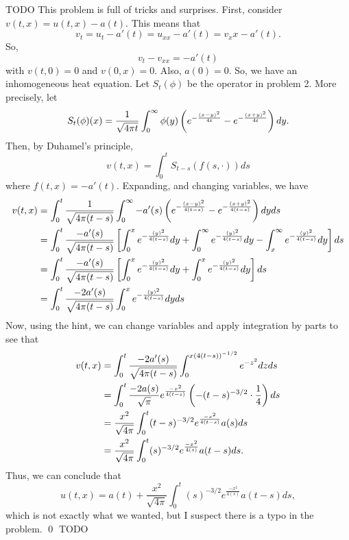 \documentclass{article}
\begin{document}
\newpage
{} TODO
 \tri
\hop 
\solution
This problem is full of tricks and surprises. First, consider $v(t,x) = u(t,x) - a(t)$. This means that 
\[v_t = u_t - a'(t) = u_{xx} - a'(t)= v_xx - a'(t).\]
So, 
\[v_t - v_{xx} = -a'(t)\]
with $v(t,0)= 0$ and $v(0,x) = 0$. Also, $a(0)= 0$. So, we have an inhomogeneous heat equation.
\hop 
Let $S_t(\phi)$ be the operator in problem 2. More precisely, let 
\[S_t(\phi)(x) = \frac{1}{\sqrt{4\pi t}} \int_0^\infty \phi(y)\del{e^{-\frac{(x-y)^2}{4t}} - e^{-\frac{(x+y)^2}{4t}}}dy.\] 
Then, by Duhamel's principle, 
\[v(t,x) = \int_0^tS_{t-s}(f(s, \cdot))ds\]
where $f(t,x) = -a'(t)$. Expanding, and changing variables, we have 
\begin{align*}
    v(t,x) &= \int_0^t \frac{1}{\sqrt{4\pi (t-s)}} \int_0^\infty -a'(s)\del{e^{-\frac{(x-y)^2}{4(t-s)}} - e^{-\frac{(x+y)^2}{4(t-s)}}}dy ds \\
    &= \int_0^t \frac{-a'(s)}{\sqrt{4\pi (t-s)}} \sbr{\int_0^x e^{-\frac{(y)^2}{4(t-s)}}dy+\int_0^\infty e^{-\frac{(y)^2}{4(t-s)}}dy-\int_x^\infty e^{-\frac{(y)^2}{4(t-s)}}dy} ds\\
    &= \int_0^t \frac{-a'(s)}{\sqrt{4\pi (t-s)}} \sbr{\int_0^x e^{-\frac{(y)^2}{4(t-s)}}dy+\int_0^x e^{-\frac{(y)^2}{4(t-s)}}dy} ds\\
    &= \int_0^t \frac{-2a'(s)}{\sqrt{4\pi (t-s)}}\int_0^x e^{-\frac{(y)^2}{4(t-s)}}dy ds
\end{align*}
Now, using the hint, we can change variables and apply integration by parts to see that 
\begin{align*}
    v(t,x) &=  \int_0^t \frac{-2a'(s)}{\sqrt{4\pi (t-s)}}\int_0^{x(4(t-s))^{-1/2}} e^{-z^2}dz ds\\
    &=  \int_0^t \frac{-2a(s)}{\sqrt{\pi}} e^{\frac{-x^2}{4(t-s)}} \del{-(t-s)^{-3/2} \cdot \frac{1}{4}} ds\\
    &=  \frac{x^2}{\sqrt{4\pi}}\int_0^t (t-s)^{-3/2} e^{\frac{-x^2}{4(t-s)}}a(s) ds\\
    &=  \frac{x^2}{\sqrt{4\pi}}\int_0^t (s)^{-3/2} e^{\frac{-x^2}{4(s)}}a(t-s) ds.
\end{align*}
Thus, we can conclude that 
\[u(t,x)= a(t) + \frac{x^2}{\sqrt{4\pi}}\int_0^t (s)^{-3/2} e^{\frac{-x^2}{4(s)}}a(t-s) ds,\]
which is not exactly what we wanted, but I suspect there is a typo in the problem. \qed
\newpage
{} TODO
 \tri
\hop 
\solution
\end{document}
